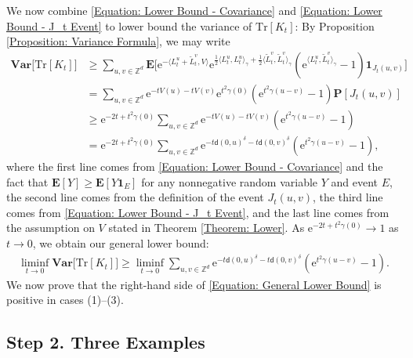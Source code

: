 \documentclass{amsart}
\numberwithin{equation}{section}
\theoremstyle{definition}
\newcommand\de{\delta}
\newcommand\ga{\gamma}
\newcommand\mbb{\mathbb}
\newcommand\mbf{\mathbf}
\newcommand\mr{\mathrm}
\newcommand\msf{\mathsf}
\begin{document}
%

We now combine \eqref{Equation: Lower Bound - Covariance}
and \eqref{Equation: Lower Bound - J_t Event} to lower bound the variance of $\mr{Tr}[K_t]$:
By Proposition \ref{Proposition: Variance Formula}, we may write 
\begin{align}
\mbf{Var}\big[\mr{Tr}[K_t]\big]&\geq\sum_{u,v\in\mbb Z^d}\mbf E\Big[\mr e^{-\langle L^u_t+\tilde L^v_t,V\rangle}
\mr e^{\frac12\langle L_t^u,L_t^u\rangle_\ga+\frac12\langle\tilde L_t^v,\tilde L_t^v\rangle_\ga}\left(\mr e^{\langle L_t^u,\tilde L_t^v\rangle_\ga}-1\right)
\mbf 1_{J_t(u,v)}\Big]\nonumber\\
&=\sum_{u,v\in\mbb Z^d}\mr e^{-tV(u)-tV(v)}\mr e^{t^2\ga(0)}\left(\mr e^{t^2\ga(u-v)}-1\right)\mbf P[J_t(u,v)]\nonumber\\
&\geq\mr e^{-2t+t^2\ga(0)}\sum_{u,v\in\mbb Z^d}\mr e^{-tV(u)-tV(v)}\left(\mr e^{t^2\ga(u-v)}-1\right)\nonumber\\
&=\mr e^{-2t+t^2\ga(0)}\sum_{u,v\in\mbb Z^d}\mr e^{-t\msf d(0,u)^\de-t\msf d(0,v)^\de}\left(\mr e^{t^2\ga(u-v)}-1\right),\label{eq:VarLowLast}
\end{align}
where the first line comes from \eqref{Equation: Lower Bound - Covariance} and
the fact that $\mbf E[Y]\geq\mbf E[Y\mbf 1_E]$ for any nonnegative random variable $Y$
and event $E$, the second line comes from the definition of the event $J_t(u,v)$,
the third line comes from \eqref{Equation: Lower Bound - J_t Event},
and the last line comes from the assumption on $V$ stated in Theorem \ref{Theorem: Lower}.
As $\mr e^{-2t+t^2\ga(0)}\to1$ as $t\to0$, we obtain our general lower bound:
\begin{align}
\label{Equation: General Lower Bound}
\liminf_{t\to0}\mbf{Var}\big[\mr{Tr}[K_t]\big]\geq\liminf_{t\to0}\sum_{u,v\in\mbb Z^d}\mr e^{-t\msf d(0,u)^\de-t\msf d(0,v)^\de}\left(\mr e^{t^2\ga(u-v)}-1\right).
\end{align}
We now prove that the right-hand side of \eqref{Equation: General Lower Bound} is positive in cases (1)--(3).

%

\subsection{Step 2. Three Examples}

%
\end{document}
